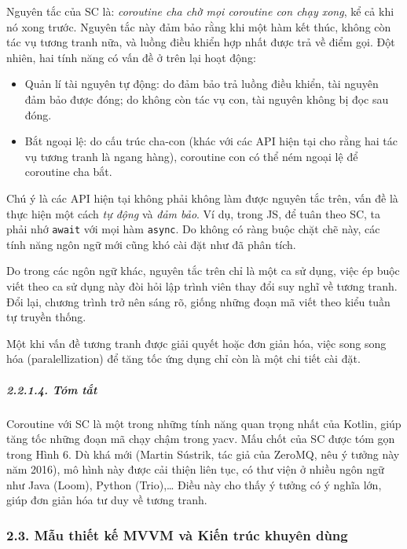 \documentclass[
]{article}
\providecommand{\tightlist}{%
  \setlength{\itemsep}{0pt}\setlength{\parskip}{0pt}}
\begin{document}
Nguyên tắc của SC là: \emph{coroutine cha chờ mọi coroutine con chạy
xong}, kể cả khi nó xong trước. Nguyên tắc này đảm bảo rằng khi một hàm
kết thúc, không còn tác vụ tương tranh nữa, và luồng điều khiển hợp nhất
được trả về điểm gọi. Đột nhiên, hai tính năng có vấn đề ở trên lại hoạt
động:

\begin{itemize}
\tightlist
\item
  Quản lí tài nguyên tự động: do đảm bảo trả luồng điều khiển, tài
  nguyên đảm bảo được đóng; do không còn tác vụ con, tài nguyên không bị
  đọc sau đóng.
\item
  Bắt ngoại lệ: do cấu trúc cha-con (khác với các API hiện tại cho rằng
  hai tác vụ tương tranh là ngang hàng), coroutine con có thể ném ngoại
  lệ để coroutine cha bắt.
\end{itemize}

Chú ý là các API hiện tại không phải không làm được nguyên tắc trên, vấn
đề là thực hiện một cách \emph{tự động} và \emph{đảm bảo}. Ví dụ, trong
JS, để tuân theo SC, ta phải nhớ \texttt{await} với mọi hàm
\texttt{async}. Do không có ràng buộc chặt chẽ này, các tính năng ngôn
ngữ mới cũng khó cài đặt như đã phân tích.

Do trong các ngôn ngữ khác, nguyên tắc trên chỉ là một ca sử dụng, việc
ép buộc viết theo ca sử dụng này đòi hỏi lập trình viên thay đổi suy
nghĩ về tương tranh. Đổi lại, chương trình trở nên sáng rõ, giống những
đoạn mã viết theo kiểu tuần tự truyền thống.

Một khi vấn đề tương tranh được giải quyết hoặc đơn giản hóa, việc song
song hóa (paralellization) để tăng tốc ứng dụng chỉ còn là một chi tiết
cài đặt.

\hypertarget{tuxf3m-tux1eaft}{%
\subparagraph{2.2.1.4. Tóm tắt}\label{tuxf3m-tux1eaft}}

Coroutine với SC là một trong những tính năng quan trọng nhất của
Kotlin, giúp tăng tốc những đoạn mã chạy chậm trong yacv. Mấu chốt của
SC được tóm gọn trong Hình 6. Dù khá mới (Martin Sústrik, tác giả của
ZeroMQ, nêu ý tưởng này năm 2016), mô hình này được cải thiện liên tục,
có thư viện ở nhiều ngôn ngữ như Java (Loom), Python (Trio),\ldots{}
Điều này cho thấy ý tưởng có ý nghĩa lớn, giúp đơn giản hóa tư duy về
tương tranh.

\hypertarget{mux1eabu-thiux1ebft-kux1ebf-mvvm-vuxe0-kiux1ebfn-truxfac-khuyuxean-duxf9ng}{%
\subsubsection{\texorpdfstring{2.3. Mẫu thiết kế MVVM và Kiến trúc
khuyên dùng
}{2.3. Mẫu thiết kế MVVM và Kiến trúc khuyên dùng }}\label{mux1eabu-thiux1ebft-kux1ebf-mvvm-vuxe0-kiux1ebfn-truxfac-khuyuxean-duxf9ng}}
\end{document}
